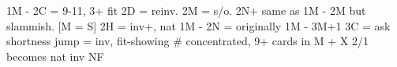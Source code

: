 1M - 2C = 9-11, 3+ fit
    2D = reinv. 2M = s/o. 2N+ same as 1M - 2M but slammish.
    [M = S] 2H = inv+, nat
1M - 2N = originally 1M - 3M+1
    3C = ask shortness
jump = inv, fit-showing  # concentrated, 9+ cards in M + X
2/1 becomes nat inv NF
